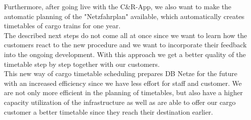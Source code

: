 Furthermore, after going live with the C\&R-App, we also want to make the automatic planning of the "Netzfahrplan" available, which automatically creates timetables of cargo trains for one year. \\
The described next steps do not come all at once since we want to learn how the customers react to the new procedure and we want to incorporate their feedback into the ongoing development. With this approach we get a better quality of the timetable step by step together with our customers. \\
This new way of cargo timetable scheduling prepares DB Netze for the future with an increased efficiency since we have less effort for staff and customer. We are not only more efficient in the planning of timetables, but also have a higher capacity utilization of the infrastructure as well as are able to offer our cargo customer a better timetable since they reach their destination earlier.   \\

